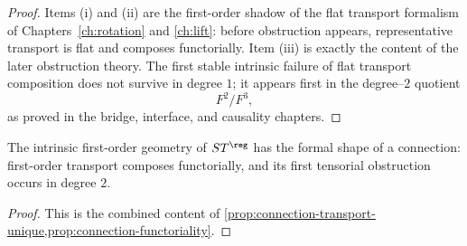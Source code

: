 \begin{proof}
	Items \textup{(i)} and \textup{(ii)} are the first-order shadow of the
	flat transport formalism of Chapters~\ref{ch:rotation} and
	\ref{ch:lift}: before obstruction appears, representative transport is
	flat and composes functorially.
	Item \textup{(iii)} is exactly the content of the later obstruction
	theory.  The first stable intrinsic failure of flat transport
	composition does not survive in degree \(1\); it appears first in the
	degree--\(2\) quotient
	\[
		F^2/F^3,
	\]
	as proved in the bridge, interface, and causality chapters.
\end{proof}
\begin{corollary}
	\label{cor:connection-pattern}
	The intrinsic first-order geometry of \(ST^{\reg}\) has the formal shape
	of a connection: first-order transport composes functorially, and its
	first tensorial obstruction occurs in degree \(2\).
\end{corollary}
\begin{proof}
	This is the combined content of
	\cref{prop:connection-transport-unique,prop:connection-functoriality}.
\end{proof}
